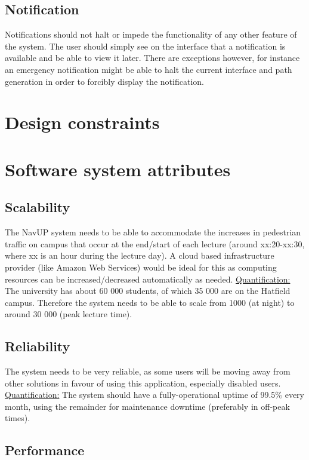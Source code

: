 \documentclass[english]{article}
\begin{document}
	\subsection{Notification}
Notifications should not halt or impede the functionality of any other feature of the system. The user should simply see on the interface that a notification is available and be able to view it later. There are exceptions however, for instance an emergency notification might be able to halt the current interface and path generation in order to forcibly display the notification. 
	\section{Design constraints}
	

	\section{Software system attributes}
	\subsection{Scalability}
	The NavUP system needs to be able to accommodate the increases in pedestrian traffic on campus that occur at the end/start of each lecture (around xx:20-xx:30, where xx is an hour during the lecture day). A cloud based infrastructure provider (like Amazon Web Services) would be ideal for this as computing resources can be increased/decreased automatically as needed.
	\newline
	\newline
	\underline{Quantification:} The university has about 60 000 students, of which 35 000 are on the Hatfield campus. Therefore the system needs to be able to scale from 1000 (at night) to around 30 000 (peak lecture time).
	\subsection{Reliability}
	The system needs to be very reliable, as some users will be moving away from other solutions in favour of using this application, especially disabled users.
	\newline
	\newline
	\underline{Quantification:} The system should have a fully-operational uptime of 99.5\% every month, using the remainder for maintenance downtime (preferably in off-peak times).
	\subsection{Performance}
\end{document}
